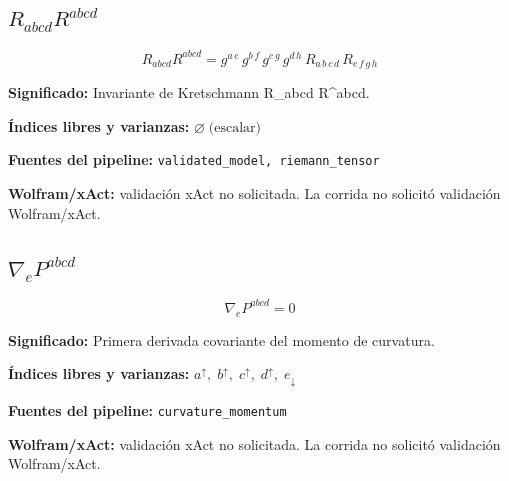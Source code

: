 \documentclass[11pt]{article}
\begin{document}
\subsection*{$ R_{abcd}R^{abcd} $}
\begin{dmath*}[breakdepth={5}]
R_{abcd}R^{abcd} = g{}^{a\,e}\,g{}^{b\,f}\,g{}^{c\,g}\,g{}^{d\,h}\,R{}_{a\,b\,c\,d}\,R{}_{e\,f\,g\,h}
\end{dmath*}
\par\vspace{1.2\baselineskip}\noindent
\begin{minipage}{\linewidth}
\textbf{Significado:} Invariante de Kretschmann R\_abcd R^abcd.\par
\textbf{Índices libres y varianzas:} $ \varnothing\;\text{(escalar)} $\par
\textbf{Fuentes del pipeline:} \texttt{validated\_model, riemann\_tensor}\par
\textbf{Wolfram/xAct:} validación xAct no solicitada. La corrida no solicitó validación Wolfram/xAct.\par
\end{minipage}
\subsection*{$ \nabla_e P^{abcd} $}
\begin{dmath*}[breakdepth={5}]
\nabla_e P^{abcd} = 0
\end{dmath*}
\par\vspace{1.2\baselineskip}\noindent
\begin{minipage}{\linewidth}
\textbf{Significado:} Primera derivada covariante del momento de curvatura.\par
\textbf{Índices libres y varianzas:} $ a^{\uparrow},\;b^{\uparrow},\;c^{\uparrow},\;d^{\uparrow},\;e_{\downarrow} $\par
\textbf{Fuentes del pipeline:} \texttt{curvature\_momentum}\par
\textbf{Wolfram/xAct:} validación xAct no solicitada. La corrida no solicitó validación Wolfram/xAct.\par
\end{minipage}
\end{document}
